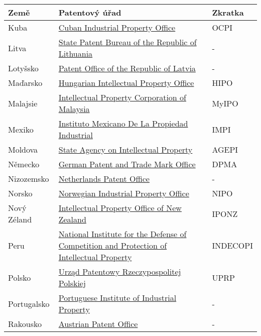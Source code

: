 	\begin{table}[h!]
	\centering
	\begin{tabular}{|>{\centering\arraybackslash}p{2.2cm}|>{\centering\arraybackslash}p{8cm}|>{\centering\arraybackslash}p{2cm}|} 
	\hline
	\textbf{Země}    & \textbf{Patentový úřad} & \textbf{Zkratka}                \\ 
	\hline
	Kuba & \href{http://www.ocpi.cu}{Cuban Industrial Property Office}  & OCPI         \\ 
	\hline
	Litva & \href{http://vpb.lrv.lt/en/}{State Patent Bureau of the Republic of Lithuania}  & -         \\
	\hline
 	Lotyšsko & \href{https://www.lrpv.gov.lv/lv}{Patent Office of the Republic of Latvia}  & -         \\ 
	\hline
	Maďarsko & \href{http://www.hipo.gov.hu/}{Hungarian Intellectual Property Office}  & HIPO         \\ 
	\hline
	Malajsie & \href{http://www.myipo.gov.my/}{Intellectual Property Corporation of Malaysia}  & MyIPO         \\ 
	\hline
	Mexiko & \href{https://www.gob.mx/impi/en}{Instituto Mexicano De La Propiedad Industrial}  & IMPI         \\ 
	\hline
	Moldova & \href{http://www.agepi.gov.md/}{State Agency on Intellectual Property}  & AGEPI         \\ 
	\hline
	Německo & \href{http://www.dpma.de/}{German Patent and Trade Mark Office}  & DPMA         \\ 
	\hline
	Nizozemsko & \href{http://www.rvo.nl/octrooien}{Netherlands Patent Office}  & -         \\ 
	\hline
	Norsko & \href{https://www.patentstyret.no/en/}{Norwegian Industrial Property Office}  & NIPO         \\ 
	\hline
	Nový Zéland & \href{http://www.iponz.govt.nz/}{Intellectual Property Office of New Zealand}  & IPONZ         \\ 
	\hline
	Peru & \href{http://www.indecopi.gob.pe/}{National Institute for the Defense of Competition and Protection of Intellectual Property}  & INDECOPI         \\ 
	\hline
	Polsko & \href{https://uprp.gov.pl/pl}{Urząd Patentowy Rzeczypospolitej Polskiej}  & UPRP         \\ 
	\hline
	Portugalsko & \href{https://inpi.justica.gov.pt/}{Portuguese Institute of Industrial Property}  & -         \\ 
	\hline
	Rakousko & \href{http://www.patentamt.at/}{Austrian Patent Office}  & -         \\ 

\end{tabular}
\end{table}
